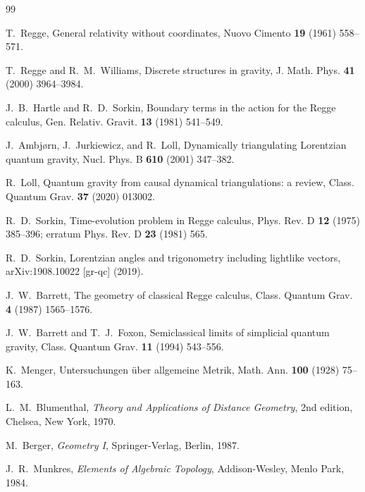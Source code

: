 \documentclass[11pt]{article}
\theoremstyle{definition}
\theoremstyle{remark}
\begin{document}
\begin{thebibliography}{99}

T.~Regge,
General relativity without coordinates,
Nuovo Cimento \textbf{19} (1961) 558--571.

T.~Regge and R.~M.~Williams,
Discrete structures in gravity,
J. Math. Phys. \textbf{41} (2000) 3964--3984.

J.~B.~Hartle and R.~D.~Sorkin,
Boundary terms in the action for the Regge calculus,
Gen. Relativ. Gravit. \textbf{13} (1981) 541--549.

J.~Ambj{\o}rn, J.~Jurkiewicz, and R.~Loll,
Dynamically triangulating Lorentzian quantum gravity,
Nucl. Phys. B \textbf{610} (2001) 347--382.

R.~Loll,
Quantum gravity from causal dynamical triangulations: a review,
Class. Quantum Grav. \textbf{37} (2020) 013002.

R.~D.~Sorkin,
Time-evolution problem in Regge calculus,
Phys. Rev. D \textbf{12} (1975) 385--396;
erratum Phys. Rev. D \textbf{23} (1981) 565.

R.~D.~Sorkin,
Lorentzian angles and trigonometry including lightlike vectors,
arXiv:1908.10022 [gr-qc] (2019).

J.~W.~Barrett,
The geometry of classical Regge calculus,
Class. Quantum Grav. \textbf{4} (1987) 1565--1576.

J.~W.~Barrett and T.~J.~Foxon,
Semiclassical limits of simplicial quantum gravity,
Class. Quantum Grav. \textbf{11} (1994) 543--556.

K.~Menger,
Untersuchungen \"uber allgemeine Metrik,
Math. Ann. \textbf{100} (1928) 75--163.

L.~M.~Blumenthal,
\emph{Theory and Applications of Distance Geometry},
2nd edition, Chelsea, New York, 1970.

M.~Berger,
\emph{Geometry I},
Springer-Verlag, Berlin, 1987.

J.~R.~Munkres,
\emph{Elements of Algebraic Topology},
Addison-Wesley, Menlo Park, 1984.

\end{thebibliography}
\end{document}
